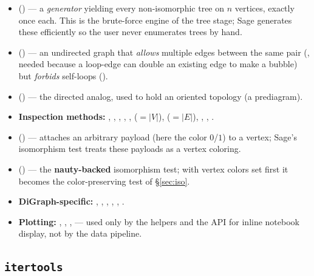\begin{itemize}
  \item {} () --- a
        \emph{generator} yielding every non-isomorphic tree on $n$ vertices,
        exactly once each. This is the brute-force engine of the tree stage; Sage
        generates these efficiently so the user never enumerates trees by hand.
  \item {}
        () --- an undirected graph that
        \emph{allows} multiple edges between the same pair (,
        needed because a loop-edge can double an existing edge to make a bubble)
        but \emph{forbids} self-loops ().
  \item {}
        () --- the directed analog, used to
        hold an oriented topology (a prediagram).
  \item \textbf{Inspection methods:} , ,
        , , ,
         ($=|V|$),  ($=|E|$), ,
        , .
  \item {} ()
        --- attaches an arbitrary payload (here the color $0$/$1$) to a vertex;
        Sage's isomorphism test treats these payloads as a vertex coloring.
  \item {} () ---
        the \textbf{nauty-backed} isomorphism test; with vertex colors set first
        it becomes the color-preserving test of \S\ref{sec:iso}.
  \item \textbf{DiGraph-specific:} , , , ,
        , .
  \item \textbf{Plotting:} , ,
        ,  --- used only by the 
        helpers and the  API for inline notebook display, not by the
        data pipeline.
\end{itemize}

\subsection{\texttt{itertools}}
\label{sec:itertools}

